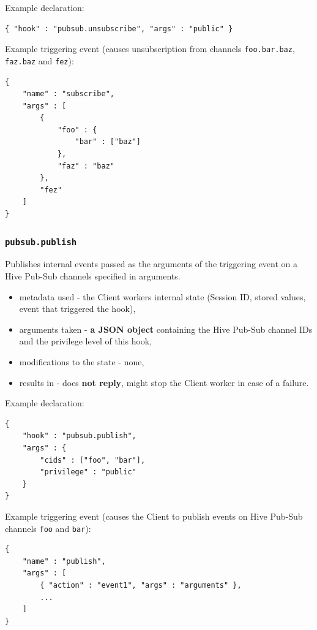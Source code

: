 \documentclass[a4paper]{article}
\begin{document}
\noindent
Example declaration:

\begin{verbatim}
{ "hook" : "pubsub.unsubscribe", "args" : "public" }
\end{verbatim}




\noindent
Example triggering event (causes unsubscription from channels \texttt{foo.bar.baz}, \texttt{faz.baz} and \texttt{fez}):


\begin{verbatim}
{
    "name" : "subscribe",
    "args" : [
        {
            "foo" : {
                "bar" : ["baz"]
            },
            "faz" : "baz"
        },
        "fez"
    ]
}
\end{verbatim}
\subsubsection{\texttt{pubsub.publish}}
\label{sec-9-2-7}


Publishes internal events passed as the arguments of the triggering event on a Hive Pub-Sub channels specified in arguments.


\begin{itemize}
\item metadata used - the Client workers internal state (Session ID, stored values, event that triggered the hook),
\item arguments taken - \textbf{a JSON object} containing the Hive Pub-Sub channel IDs and the privilege level of this hook,
\item modifications to the state - none,
\item results in - does \textbf{not reply}, might stop the Client worker in case of a failure.
\end{itemize}

\noindent
Example declaration:

\begin{verbatim}
{
    "hook" : "pubsub.publish",
    "args" : {
        "cids" : ["foo", "bar"],
        "privilege" : "public"
    }
}
\end{verbatim}




\noindent
Example triggering event (causes the Client to publish events on Hive Pub-Sub channels \texttt{foo} and \texttt{bar}):


\begin{verbatim}
{
    "name" : "publish",
    "args" : [
        { "action" : "event1", "args" : "arguments" },
        ...
    ]
}
\end{verbatim}
\end{document}
